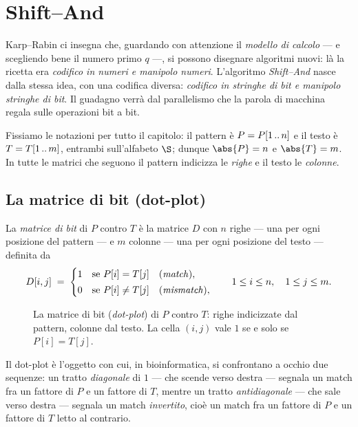 \chapter{Shift--And}
\label{cap:shift-and}

Karp--Rabin ci insegna che, guardando con attenzione il \emph{modello di calcolo} --- e
scegliendo bene il numero primo $q$ ---, si possono disegnare algoritmi nuovi: là la ricetta era
\emph{codifico in numeri e manipolo numeri}. L'algoritmo \emph{Shift--And} nasce dalla stessa
idea, con una codifica diversa: \emph{codifico in stringhe di bit e manipolo stringhe di bit}.
Il guadagno verrà dal parallelismo che la parola di macchina regala sulle operazioni bit a bit.

Fissiamo le notazioni per tutto il capitolo: il pattern è $P=P[1\,..\,n]$ e il testo è
$T=T[1\,..\,m]$, entrambi sull'alfabeto $\alfa$; dunque $\abs{P}=n$ e $\abs{T}=m$. In tutte le
matrici che seguono il pattern indicizza le \emph{righe} e il testo le \emph{colonne}.


\section{La matrice di bit (dot-plot)}

\begin{definizione}
\label{def:shift-and-dotplot}
La \emph{matrice di bit} di $P$ contro $T$ è la matrice $D$ con $n$ righe --- una per ogni
posizione del pattern --- e $m$ colonne --- una per ogni posizione del testo --- definita da
\[
  D[i,j]\;=\;
  \begin{cases}
    1 & \text{se } P[i]=T[j] \quad \text{(\emph{match})},\\[2pt]
    0 & \text{se } P[i]\neq T[j] \quad \text{(\emph{mismatch})},
  \end{cases}
  \qquad 1\le i\le n,\quad 1\le j\le m .
\]
\end{definizione}

\begin{figure}[H]
\centering

\caption{La matrice di bit (\emph{dot-plot}) di $P$ contro $T$: righe indicizzate dal pattern,
colonne dal testo. La cella $(i,j)$ vale $1$ se e solo se $P[i]=T[j]$.}
\label{fig:shift-and-dotplot}
\end{figure}

\begin{osservazione}
Il dot-plot è l'oggetto con cui, in bioinformatica, si confrontano a occhio due sequenze: un
tratto \emph{diagonale} di $1$ --- che scende verso destra --- segnala un match fra un fattore di
$P$ e un fattore di $T$, mentre un tratto \emph{antidiagonale} --- che sale verso destra ---
segnala un match \emph{invertito}, cioè un match fra un fattore di $P$ e un fattore di $T$ letto
al contrario.
\end{osservazione}

